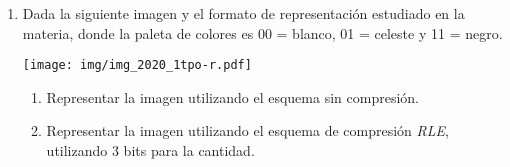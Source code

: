 \documentclass[12pt]{article}
\begin{document}
\begin{enumerate}
    \item Dada la siguiente imagen y el formato de representación estudiado en
        la materia,
        donde la paleta de colores es 00 = blanco, 01 = celeste y 11 = negro.

        {
            \centering
            \texttt{[image: img/img\_2020\_1tpo-r.pdf]}
            \par
        }

    \begin{enumerate}

        \item Representar la imagen utilizando el esquema sin compresión.

        \item Representar la imagen utilizando el esquema de compresión
            \emph{RLE}, utilizando 3 bits para la cantidad.

    \end{enumerate}

\end{enumerate}
\end{document}
